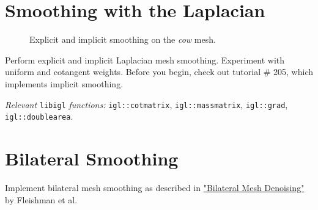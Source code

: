 \documentclass[11pt]{amsart}
\begin{document}
\section{Smoothing with the Laplacian}
\begin{figure}[H]
   \centering
\hspace{0.4cm}
\hspace{0.4cm}
   \caption{Explicit and implicit smoothing on the \emph{cow} mesh.}
   \label{fig:cow}
\end{figure}
Perform explicit and implicit Laplacian mesh smoothing. Experiment with uniform
and cotangent weights. Before you begin, check out tutorial \# 205, which
implements implicit smoothing.  

\emph{Relevant} \texttt{libigl} \emph{functions: } \texttt{igl::cotmatrix}, \texttt{igl::massmatrix}, \texttt{igl::grad}, \texttt{igl::doublearea}.

\section{Bilateral Smoothing}
Implement bilateral mesh smoothing as described in
\href{http://www.cs.tau.ac.il/~dcor/online_papers/papers/shachar03.pdf}{"Bilateral
Mesh Denoising"} by Fleishman et al.
\end{document}
